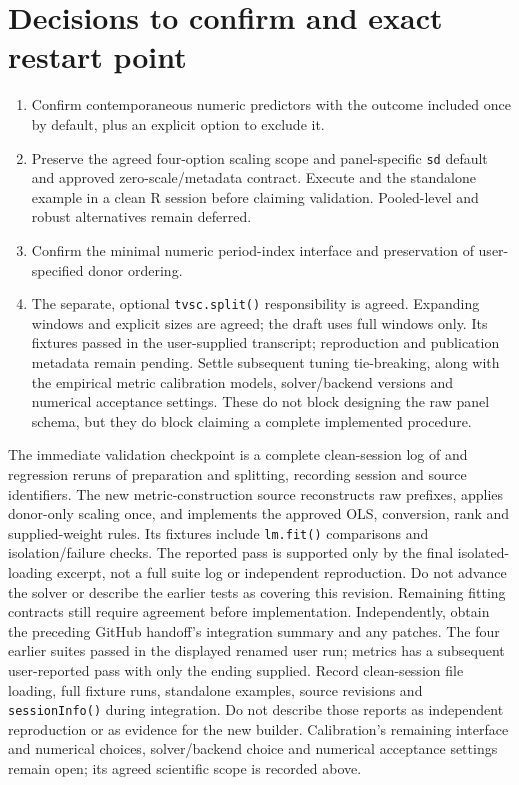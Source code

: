 \documentclass[11pt]{article}
\begin{document}
\section{Decisions to confirm and exact restart point}\label{sec:decisions}
\begin{enumerate}
\item Confirm contemporaneous numeric predictors with the outcome included
once by default, plus an explicit option to exclude it.
\item Preserve the agreed four-option scaling scope and panel-specific
\texttt{sd} default and approved zero-scale/metadata contract. Execute
 and the standalone example in a clean R
session before claiming validation. Pooled-level and robust alternatives
remain deferred.
\item Confirm the minimal numeric period-index interface and preservation
of user-specified donor ordering.
\item The separate, optional \texttt{tvsc.split()} responsibility is agreed.
Expanding windows and explicit sizes are agreed; the draft uses full windows
only. Its fixtures passed in the user-supplied transcript; reproduction and
publication metadata remain pending. Settle subsequent
tuning tie-breaking, along with
the empirical metric calibration models, solver/backend versions and
numerical acceptance settings. These do not block designing the raw panel
schema, but they do block claiming a complete implemented procedure.
\end{enumerate}
The immediate validation checkpoint is a complete clean-session log of
 and regression reruns of preparation and
splitting, recording session and source identifiers. The new metric-construction source reconstructs raw
prefixes, applies donor-only scaling once, and implements the approved
OLS, conversion, rank and supplied-weight rules. Its fixtures include
\texttt{lm.fit()} comparisons and isolation/failure checks. The reported
pass is supported only by the final isolated-loading excerpt, not a full
suite log or independent reproduction. Do not advance the solver or describe the earlier tests
as covering this revision. Remaining fitting contracts still require
agreement before implementation.
Independently, obtain the preceding GitHub handoff's integration
summary and any patches. The four earlier suites passed in the displayed
renamed user run; metrics has a subsequent user-reported pass with only
the ending supplied. Record clean-session file loading, full fixture runs,
standalone examples, source revisions and \texttt{sessionInfo()} during
integration. Do not describe those reports as independent reproduction or
as evidence for the new builder. Calibration's remaining interface and
numerical choices, solver/backend choice and numerical acceptance settings
remain open; its agreed scientific scope is recorded above.
\end{document}
